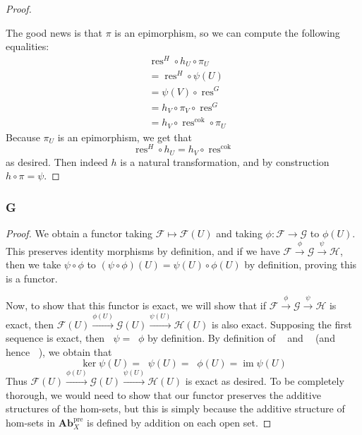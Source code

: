 \documentclass{article}
\newcommand{\fF}{\mathscr{F}}
\newcommand{\fG}{\mathscr{G}}
\newcommand{\fH}{\mathscr{H}}
\newcommand{\Ab}{\mathbf{Ab}} %
\DeclareMathOperator{\res}{\mathrm{res}}
\DeclareMathOperator{\im}{\mathrm{im}}
\DeclareMathOperator{\cok}{\mathrm{cok}}
\DeclareMathOperator{\kerpre}{\ker_{\text{pre}}}
\DeclareMathOperator{\cokpre}{\cok_{\text{pre}}}
\DeclareMathOperator{\impre}{\im_{\text{pre}}}
\begin{document}
\begin{proof}
    \begin{center}
    \end{center}
    The good news is that $\pi$ is an epimorphism, so we can compute the following equalities:
    \begin{align*}
        &\res^H \circ h_U \circ \pi_U\\
        &=\res^H\circ \psi(U)\\
        &=\psi(V)\circ \res^G\\
        &=h_V\circ \pi_V\circ \res^G\\
        &=h_V\circ \res^{\cok}\circ \pi_U
    \end{align*}
    Because $\pi_U$ is an epimorphism, we get that
    \[
    \res^H\circ h_U=h_V\circ \res^{\cok}
    \]
    as desired. Then indeed $h$ is a natural transformation, and by construction $h\circ \pi=\psi$.
\end{proof}
\subsubsection{G}\label{2.3.G}
\begin{proof}
    We obtain a functor taking $\fF \mapsto \fF(U)$ and taking $\phi:\fF\to \fG$ to $\phi(U)$. This preserves identity morphisms by definition, and if we have $\fF \xrightarrow{\phi} \fG \xrightarrow{\psi} \fH$, then we take $\psi\circ \phi$ to $(\psi\circ \phi)(U)=\psi(U)\circ \phi(U)$ by definition, proving this is a functor.

    Now, to show that this functor is exact, we will show that if $\fF \xrightarrow{\phi} \fG \xrightarrow{\psi} \fH$ is exact, then $\fF(U) \xrightarrow{\phi(U)} \fG(U) \xrightarrow{\psi(U)} \fH(U)$ is also exact. Supposing the first sequence is exact, then $\kerpre \psi=\impre \phi$ by definition. By definition of $\kerpre$ and $\cokpre$ (and hence $\impre$), we obtain that
    \[
    \ker \psi(U)=\kerpre \psi(U)=\impre \phi (U)=\im \psi(U)
    \]
    Thus $\fF(U) \xrightarrow{\phi(U)} \fG(U) \xrightarrow{\psi(U)} \fH(U)$ is exact as desired. To be completely thorough, we would need to show that our functor preserves the additive structures of the hom-sets, but this is simply because the additive structure of hom-sets in $\Ab_X^{\text{pre}}$ is defined by addition on each open set.
\end{proof}
\end{document}
